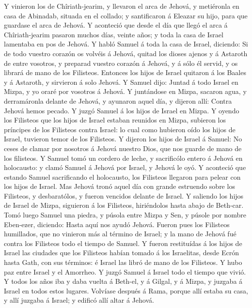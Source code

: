  Y vinieron los de Chîriath-jearim, y llevaron el arca de
Jehová, y metiéronla en casa de Abinadab, situada en el collado; y
santificaron á Eleazar su hijo, para que guardase el arca de Jehová.
 Y aconteció que desde el día que llegó el arca á
Chîriath-jearim pasaron muchos días, veinte años; y toda la casa de
Israel lamentaba en pos de Jehová.  Y habló Samuel á toda la
casa de Israel, diciendo: Si de todo vuestro corazón os volvéis á
Jehová, quitad los dioses ajenos y á Astaroth de entre vosotros, y
preparad vuestro corazón á Jehová, y á sólo él servid, y os librará de
mano de los Filisteos.  Entonces los hijos de Israel
quitaron á los Baales y á Astaroth, y sirvieron á solo Jehová.
 Y Samuel dijo: Juntad á todo Israel en Mizpa, y yo oraré
por vosotros á Jehová.  Y juntándose en Mizpa, sacaron agua,
y derramáronla delante de Jehová, y ayunaron aquel día, y dijeron allí:
Contra Jehová hemos pecado. Y juzgó Samuel á los hijos de Israel en
Mizpa.  Y oyendo los Filisteos que los hijos de Israel
estaban reunidos en Mizpa, subieron los príncipes de los Filisteos
contra Israel: lo cual como hubieron oído los hijos de Israel, tuvieron
temor de los Filisteos.  Y dijeron los hijos de Israel á
Samuel: No ceses de clamar por nosotros á Jehová nuestro Dios, que nos
guarde de mano de los filisteos.  Y Samuel tomó un cordero
de leche, y sacrificólo entero á Jehová en holocausto: y clamó Samuel á
Jehová por Israel, y Jehová le oyó.  Y aconteció que
estando Samuel sacrificando el holocausto, los Filisteos llegaron para
pelear con los hijos de Israel. Mas Jehová tronó aquel día con grande
estruendo sobre los Filisteos, y desbaratólos, y fueron vencidos delante
de Israel.  Y saliendo los hijos de Israel de Mizpa,
siguieron á los Filisteos, hiriéndolos hasta abajo de Beth-car.
 Tomó luego Samuel una piedra, y púsola entre Mizpa y Sen,
y púsole por nombre Eben-ezer, diciendo: Hasta aquí nos ayudó Jehová.
 Fueron pues los Filisteos humillados, que no vinieron más
al término de Israel; y la mano de Jehová fué contra los Filisteos todo
el tiempo de Samuel.  Y fueron restituídas á los hijos de
Israel las ciudades que los Filisteos habían tomado á los Israelitas,
desde Ecrón hasta Gath, con sus términos: é Israel las libró de mano de
los Filisteos. Y hubo paz entre Israel y el Amorrheo.  Y
juzgó Samuel á Israel todo el tiempo que vivió.  Y todos
los años iba y daba vuelta á Beth-el, y á Gilgal, y á Mizpa, y juzgaba á
Israel en todos estos lugares.  Volvíase después á Rama,
porque allí estaba su casa, y allí juzgaba á Israel; y edificó allí
altar á Jehová.

